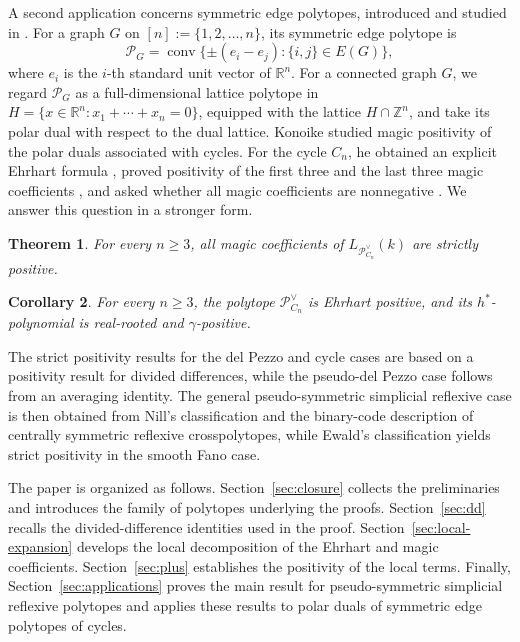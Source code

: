 \documentclass[10pt,a4paper]{amsart}
\newtheorem{Theorem}{Theorem}[section]
\newtheorem{Corollary}[Theorem]{Corollary}
\theoremstyle{definition}
\newcommand{\ZZ}{\mathbb Z}
\newcommand{\RR}{\mathbb R}
\newcommand{\conv}{\operatorname{conv}}
\newcommand{\PP}{\mathcal P}
\begin{document}
A second application concerns symmetric edge polytopes, introduced and
studied in \cite{MatsuiEtAlGraphs}.  For a graph $G$ on
$[n]:=\{1,2,\dots,n\}$, its symmetric edge polytope is
\[
\PP_G
=
\conv\{\pm(e_i-e_j):\{i,j\}\in E(G)\},
\]
where $e_i$ is the $i$-th standard unit vector of $\RR^n$.
For a connected graph $G$, we regard $\PP_G$ as a full-dimensional
lattice polytope in
$H=\{x\in\RR^n:x_1+\cdots+x_n=0\}$, equipped with the lattice
$H\cap\ZZ^n$, and take its polar dual with respect to the dual lattice.
Konoike studied magic positivity of the polar duals associated with
cycles.  For the cycle $C_n$, he obtained an explicit Ehrhart formula
\cite[Proposition~4.6]{KonoikeCycles}, proved positivity of the first
three and the last three magic coefficients
\cite[Theorem~1.4]{KonoikeCycles}, and asked whether all magic
coefficients are nonnegative
\cite[Question~4.5]{KonoikeCycles}.  We answer this question in a
stronger form.


\begin{Theorem}\label{thm:cycles}
For every $n\ge3$, all magic coefficients of
$L_{\PP_{C_n}^\vee}(k)$ are strictly positive.
\end{Theorem}


\begin{Corollary}\label{cor:cycle-consequences}
For every $n\ge3$, the polytope $\PP_{C_n}^\vee$ is Ehrhart positive,
and its $h^*$-polynomial is real-rooted and $\gamma$-positive.
\end{Corollary}

The strict positivity results for the del Pezzo and cycle cases are
based on a positivity result for divided differences, while the
pseudo-del Pezzo case follows from an averaging identity.
The general pseudo-symmetric simplicial reflexive case is then obtained
from Nill's classification and the binary-code description of centrally
symmetric reflexive crosspolytopes, while Ewald's classification yields
strict positivity in the smooth Fano case.

The paper is organized as follows.  Section~\ref{sec:closure} collects
the preliminaries and introduces the family of polytopes underlying
the proofs.  Section~\ref{sec:dd} recalls the divided-difference
identities used in the proof.  Section~\ref{sec:local-expansion} develops
the local decomposition of the Ehrhart and magic coefficients.
Section~\ref{sec:plus} establishes the positivity of the local terms.
Finally, Section~\ref{sec:applications} proves the main result for
pseudo-symmetric simplicial reflexive polytopes and applies these results
to polar duals of symmetric edge polytopes of cycles.
\end{document}

